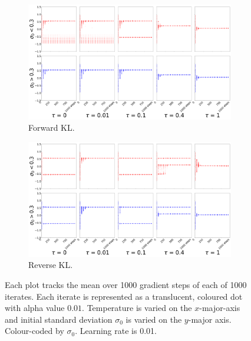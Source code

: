 \documentclass[\main/thesis.tex]{subfiles}
\begin{document}
\begin{figure}[!htb]
  \centering
  \begin{subfigure}[b]{1\linewidth}
    \centering
    \includegraphics[width=\columnwidth]{figs/bandit/notlearnQ/modes=1/rmsprop/mean_forward_optim=rmsprop_modes=1_lr=0.01.png}
    \caption{Forward KL.}
    \label{fig:bandit-mean-forward-rmsprop}
  \end{subfigure}
  
  \begin{subfigure}[b]{1\linewidth}
    \centering
    \includegraphics[width=\columnwidth]{figs/bandit/notlearnQ/modes=1/rmsprop/mean_reverse_optim=rmsprop_modes=1_lr=0.01.png}
    \caption{Reverse KL.}
    \label{fig:bandit-mean-reverse-rmsprop}
  \end{subfigure}
  \caption{Each plot tracks the mean over 1000 gradient steps of each of 1000 iterates. Each iterate is represented as a translucent, coloured dot with alpha value $0.01$. Temperature is varied on the $x$-major-axis and initial standard deviation $\sigma_0$ is varied on the $y$-major axis. Colour-coded by $\sigma_0$. Learning rate is 0.01.}
\end{figure}
\end{document}
